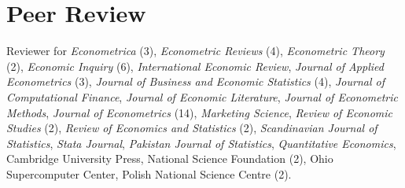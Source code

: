 \documentclass[10pt,letterpaper]{article}
\renewenvironment{itemize}{
  \begin{list}{}{
      \setlength{\leftmargin}{1.5em}
      \setlength{\itemsep}{0.25em}
      \setlength{\parskip}{0pt}
      \setlength{\parsep}{0.25em}
    }
}{
  \end{list}
}
\begin{document}

\section*{Peer Review}

Reviewer for
\textit{Econometrica} (3),
\textit{Econometric Reviews} (4),
\textit{Econometric Theory} (2),
\textit{Economic Inquiry} (6),
\textit{International Economic Review},
\textit{Journal of Applied Econometrics} (3),
\textit{Journal of Business and Economic Statistics} (4),
\textit{Journal of Computational Finance},
\textit{Journal of Economic Literature},
\textit{Journal of Econometric Methods},
\textit{Journal of Econometrics} (14),
\textit{Marketing Science},
\textit{Review of Economic Studies} (2),
\textit{Review of Economics and Statistics} (2),
\textit{Scandinavian Journal of Statistics},
\textit{Stata Journal},
\textit{Pakistan Journal of Statistics},
\textit{Quantitative Economics},
Cambridge University Press,
National Science Foundation (2),
Ohio Supercomputer Center,
Polish National Science Centre (2).
\end{document}
